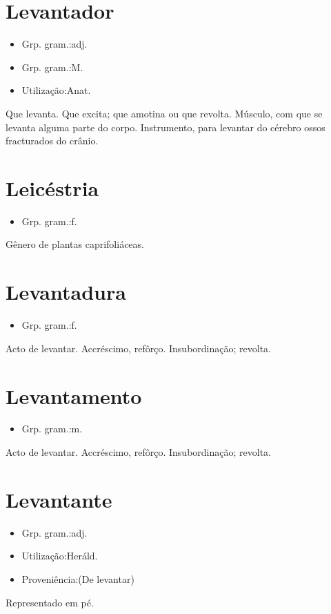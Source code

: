 \section{Levantador}
\begin{itemize}
\item {Grp. gram.:adj.}
\end{itemize}
\begin{itemize}
\item {Grp. gram.:M.}
\end{itemize}
\begin{itemize}
\item {Utilização:Anat.}
\end{itemize}
Que levanta.
Que excita; que amotina ou que revolta.
Músculo, com que se levanta alguma parte do corpo.
Instrumento, para levantar do cérebro ossos fracturados do crânio.
\section{Leicéstria}
\begin{itemize}
\item {Grp. gram.:f.}
\end{itemize}
Gênero de plantas caprifoliáceas.
\section{Levantadura}
\begin{itemize}
\item {Grp. gram.:f.}
\end{itemize}
Acto de levantar.
Accréscimo, refôrço.
Insubordinação; revolta.
\section{Levantamento}
\begin{itemize}
\item {Grp. gram.:m.}
\end{itemize}
Acto de levantar.
Accréscimo, refôrço.
Insubordinação; revolta.
\section{Levantante}
\begin{itemize}
\item {Grp. gram.:adj.}
\end{itemize}
\begin{itemize}
\item {Utilização:Heráld.}
\end{itemize}
\begin{itemize}
\item {Proveniência:(De \textunderscore levantar\textunderscore )}
\end{itemize}
Representado em pé.
